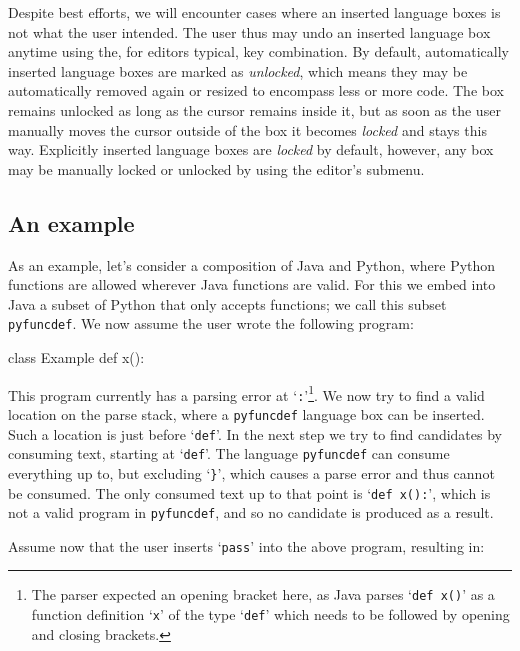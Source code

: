 \documentclass[sigplan,screen]{acmart}\settopmatter{printfolios=true,printccs=false,printacmref=false}
\newcommand{\qtt}[1]{`\texttt{#1}'\xspace}
\begin{document}
Despite best efforts,
we will encounter cases where an inserted language boxes is not what the user
intended. The user thus may undo an inserted language box anytime using the,
for editors typical,  key combination. By default, automatically inserted
language boxes are marked as \emph{unlocked}, which means they may
be automatically removed again or resized to encompass less or more code. The
box remains unlocked as long as the cursor remains inside it, but as soon as the
user manually moves the cursor outside of the box it becomes \emph{locked} and stays this
way. Explicitly inserted language boxes are \emph{locked} by default, however, any
box may be manually locked or unlocked by using the editor's submenu.

\subsection{An example}

As an example, let's consider a composition of Java and Python, where Python
functions are allowed wherever Java functions are valid. For this we embed into
Java a subset of Python that only accepts functions; we call this subset
\texttt{pyfuncdef}. We now assume the user wrote the following program:

\begin{lstdefault}[language=Java]
  class Example {
      def x():
  }
\end{lstdefault}
\vspace{1em}

This program currently has a parsing error at \qtt{:}\footnote{The parser
expected an opening bracket here, as Java parses \qtt{def x()} as a function
definition \qtt{x} of the type \qtt{def} which needs to be followed by opening
and closing brackets.}. We now try to find a valid location on the parse stack,
where a \texttt{pyfuncdef} language box can be inserted. Such a location is just
before \qtt{def}.
In the next step we try to find candidates by consuming text, starting at
\qtt{def}.  The language \texttt{pyfuncdef} can consume everything up to, but
excluding \qtt{\}}, which causes a parse error and thus cannot be consumed. The
only consumed text up to that point is \qtt{def x():}, which is not a valid
program in \texttt{pyfuncdef}, and so no candidate is produced as a result.

Assume now that the user inserts \qtt{pass} into the above program, resulting in:
\end{document}
